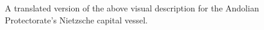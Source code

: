 \begin{figure}
\begin{center}
    \caption{A translated version of the above visual description for the Andolian Protectorate's Nietzsche capital vessel.}
    \label{fig:vessel-nietsche}
\end{center}
\end{figure}





